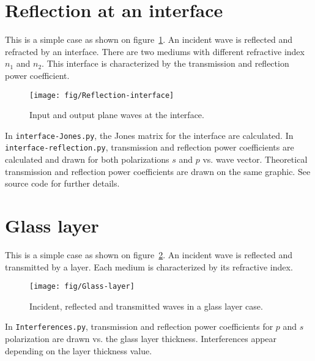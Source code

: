 

\section{Reflection at an interface}
This is a simple case as shown on figure~\ref{fig:Reflection-interface}. An incident wave is reflected and refracted by an interface. There are two mediums with different refractive index $n_1$ and $n_2$. This interface is characterized by the transmission and reflection power coefficient.
\begin{figure}[H]
\texttt{[image: fig/Reflection-interface]}
\caption{\label{fig:Reflection-interface}Input and output plane waves at the interface.}
\end{figure}
In \verb/interface-Jones.py/, the Jones matrix for the interface are calculated. In \verb/ interface-reflection.py/, transmission and reflection power coefficients are calculated and drawn for both polarizations $s$ and $p$ vs. wave vector. Theoretical transmission and reflection power coefficients are drawn on the same graphic. See source code for further details.

\section{Glass layer}
This is a simple case as shown on figure~\ref{fig:Glass-layer}. An incident wave is reflected and transmitted by a layer. Each medium is characterized by its refractive index.
\begin{figure}[H]
\texttt{[image: fig/Glass-layer]}
\caption{\label{fig:Glass-layer}Incident, reflected and transmitted waves in a glass layer case.}
\end{figure}
In \verb/Interferences.py/, transmission and reflection power coefficients for $p$ and $s$ polarization are drawn vs. the glass layer thickness. Interferences appear depending on the layer thickness value.


